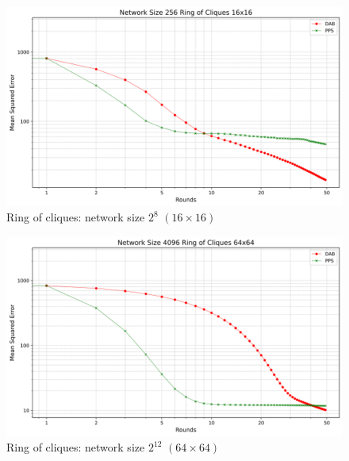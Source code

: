 \begin{figure}[H]
    \centering
    \includegraphics[scale=0.5]{figures/ringOfCliquesSimulations/DAB_vs_PPS_RoC_r50_n256.png}
    \caption{Ring of cliques: network size $2^{8}$ $(16\times16)$}
    \label{fig:256ringOfCliques}
\end{figure}

\begin{figure}[H]
    \centering
    \includegraphics[scale=0.5]{figures/ringOfCliquesSimulations/DAB_vs_PPS_RoC_r50_n4096.png}
    \caption{Ring of cliques: network size $2^{12}$ $(64\times64)$}
    \label{fig:4096ringOfCliques}
\end{figure}

